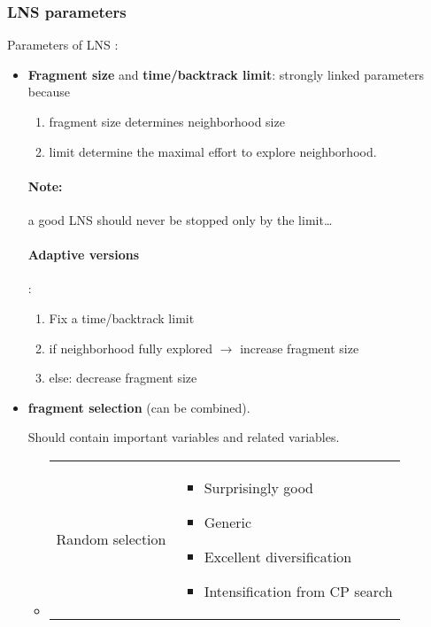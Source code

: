 \subsubsection{LNS parameters}
Parameters of LNS :
\begin{itemize}
    \item \textbf{Fragment size} and \textbf{time/backtrack limit}:
       strongly linked parameters because
       \begin{enumerate}
           \item fragment size determines neighborhood size
           \item limit determine the maximal effort to explore
       neighborhood.
       \end{enumerate}

       \paragraph{Note:} a good LNS should never be stopped only by the limit\ldots

       \paragraph{Adaptive versions}:
       \begin{enumerate}
           \item Fix a time/backtrack limit
           \item if neighborhood fully explored $\to$ increase fragment size
           \item else: decrease fragment size
       \end{enumerate}

    \item \textbf{fragment selection} (can be combined).

        Should contain important variables and related variables.

        \begin{itemize}
            \item \begin{tabular}{m{3cm}m{10cm}}
                    Random selection &
                \begin{itemize}
                    \item Surprisingly good
                    \item Generic
                    \item Excellent diversification
                    \item Intensification from CP search
                \end{itemize}
            \end{tabular}


\end{itemize}
\end{itemize}
